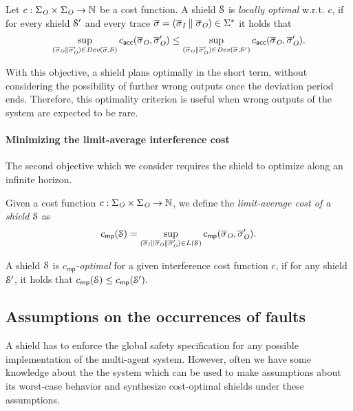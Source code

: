 \begin{defn}\label{def:locally-optimal}
Let $c : \Sigma_{\textit{O}} \times \Sigma_{\textit{O}} \to \mathbb{N}$ be a cost function. A shield $\mathcal{S}$ is \emph{locally optimal} w.r.t. $c$, if for every shield $\mathcal{S}'$ and every trace $\overline\sigma=(\overline\sigma_{\textit{I}}\parallel\overline\sigma_{\textit{O}})\in \Sigma^*$ it holds that
$$\sup_{(\overline\sigma_{\textit{O}}\parallel\overline\sigma_{\textit{O}}')\in\mathit{Dev}(\overline\sigma,\mathcal{S})} c_{\mathsf{acc}}(\overline\sigma_{\textit{O}},\overline\sigma_{\textit{O}}') \leq \sup_{(\overline\sigma_{\textit{O}}\parallel\overline\sigma_{\textit{O}}')\in\mathit{Dev}(\overline\sigma,\mathcal{S}')} c_{\mathsf{acc}}(\overline\sigma_{\textit{O}},\overline\sigma_{\textit{O}}').$$
\end{defn}
With this objective, a shield plans optimally in the short term, without considering the possibility of further wrong outputs once the deviation period ends. Therefore, this optimality criterion is useful when wrong outputs of the system are expected to be rare.

\iftrue
\paragraph*{Minimizing the limit-average interference cost}
The second objective which we consider requires the shield to optimize along an infinite horizon.

\begin{defn}\label{def:mp-optimal}
Given a cost function $c : \Sigma_{\textit{O}} \times \Sigma_{\textit{O}} \to \mathbb{N}$, we define the \emph{limit-average cost of a shield} $\mathcal{S}$ as$$c_{\mathsf{mp}}(\mathcal{S}) = \sup_{(\overline\sigma_{\textit{I}} || \overline\sigma_{\textit{O}}\parallel\overline\sigma_{\textit{O}}') \in L( \mathcal{S})}c_{\mathsf{mp}}(\overline\sigma_{\textit{O}},\overline\sigma_{\textit{O}}').$$
\end{defn}
\begin{defn}
A shield $\mathcal{S}$ is \emph{$c_{\mathsf{mp}}$-optimal} for a given interference cost function $c$, if for any shield $\mathcal{S}'$, it holds that
$c_{\mathsf{mp}}(\mathcal{S}) \leq c_{\mathsf{mp}}(\mathcal{S}').$
\end{defn}
\fi


\subsection{Assumptions on the occurrences of faults}\label{sec_assumptions}

A shield has to enforce the global safety specification for any possible  implementation of the multi-agent system.
However, often we have some knowledge about the the system which
can be used to make assumptions about its worst-case behavior and synthesize
cost-optimal shields under these assumptions.

